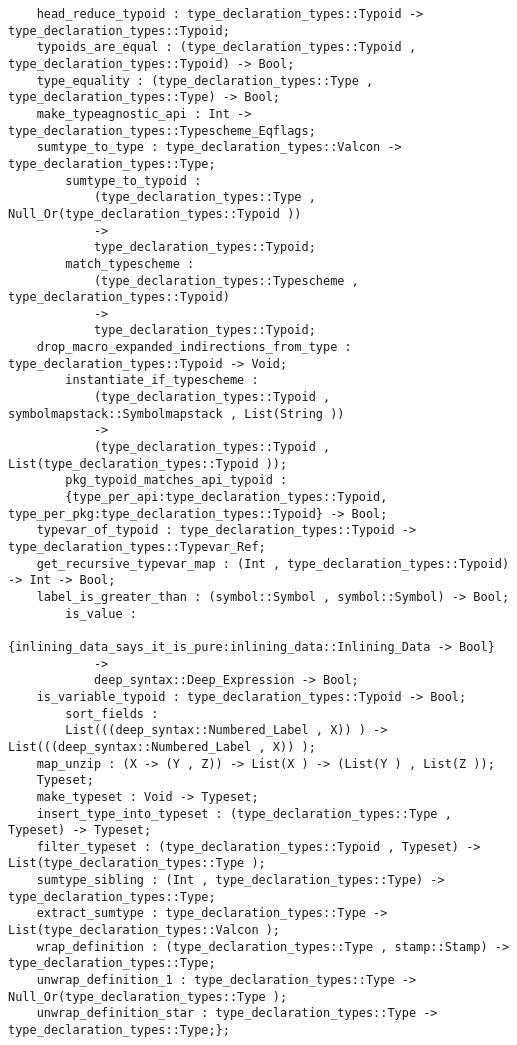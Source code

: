 \begin{verbatim}
    head_reduce_typoid : type_declaration_types::Typoid -> type_declaration_types::Typoid;
    typoids_are_equal : (type_declaration_types::Typoid , type_declaration_types::Typoid) -> Bool;
    type_equality : (type_declaration_types::Type , type_declaration_types::Type) -> Bool;
    make_typeagnostic_api : Int -> type_declaration_types::Typescheme_Eqflags;
    sumtype_to_type : type_declaration_types::Valcon -> type_declaration_types::Type;
        sumtype_to_typoid :
            (type_declaration_types::Type , Null_Or(type_declaration_types::Typoid ))
            ->
            type_declaration_types::Typoid;
        match_typescheme :
            (type_declaration_types::Typescheme , type_declaration_types::Typoid)
            ->
            type_declaration_types::Typoid;
    drop_macro_expanded_indirections_from_type : type_declaration_types::Typoid -> Void;
        instantiate_if_typescheme :
            (type_declaration_types::Typoid , symbolmapstack::Symbolmapstack , List(String ))
            ->
            (type_declaration_types::Typoid , List(type_declaration_types::Typoid ));
        pkg_typoid_matches_api_typoid :
        {type_per_api:type_declaration_types::Typoid, type_per_pkg:type_declaration_types::Typoid} -> Bool;
    typevar_of_typoid : type_declaration_types::Typoid -> type_declaration_types::Typevar_Ref;
    get_recursive_typevar_map : (Int , type_declaration_types::Typoid) -> Int -> Bool;
    label_is_greater_than : (symbol::Symbol , symbol::Symbol) -> Bool;
        is_value :
            {inlining_data_says_it_is_pure:inlining_data::Inlining_Data -> Bool}
            ->
            deep_syntax::Deep_Expression -> Bool;
    is_variable_typoid : type_declaration_types::Typoid -> Bool;
        sort_fields :
        List(((deep_syntax::Numbered_Label , X)) ) -> List(((deep_syntax::Numbered_Label , X)) );
    map_unzip : (X -> (Y , Z)) -> List(X ) -> (List(Y ) , List(Z ));
    Typeset;
    make_typeset : Void -> Typeset;
    insert_type_into_typeset : (type_declaration_types::Type , Typeset) -> Typeset;
    filter_typeset : (type_declaration_types::Typoid , Typeset) -> List(type_declaration_types::Type );
    sumtype_sibling : (Int , type_declaration_types::Type) -> type_declaration_types::Type;
    extract_sumtype : type_declaration_types::Type -> List(type_declaration_types::Valcon );
    wrap_definition : (type_declaration_types::Type , stamp::Stamp) -> type_declaration_types::Type;
    unwrap_definition_1 : type_declaration_types::Type -> Null_Or(type_declaration_types::Type );
    unwrap_definition_star : type_declaration_types::Type -> type_declaration_types::Type;};
\end{verbatim}
